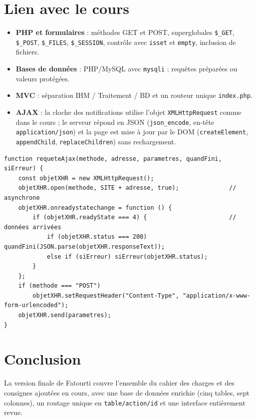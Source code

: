 \documentclass[11pt,a4paper]{article}
\begin{document}
\section{Lien avec le cours}
\begin{itemize}
\item \textbf{PHP et formulaires} : méthodes GET et POST, superglobales \texttt{\$\_GET}, \texttt{\$\_POST},
  \texttt{\$\_FILES}, \texttt{\$\_SESSION}, contrôle avec \texttt{isset} et \texttt{empty}, inclusion de fichiers.
\item \textbf{Bases de données} : PHP/MySQL avec \texttt{mysqli} ; requêtes préparées ou valeurs protégées.
\item \textbf{MVC} : séparation IHM / Traitement / BD et un routeur unique \texttt{index.php}.
\item \textbf{AJAX} : la cloche des notifications utilise l'objet \texttt{XMLHttpRequest} comme dans le cours ;
  le serveur répond en JSON (\texttt{json\_encode}, en-tête \texttt{application/json}) et la page est mise à jour
  par le DOM (\texttt{createElement}, \texttt{appendChild}, \texttt{replaceChildren}) sans rechargement.
\end{itemize}
\begin{lstlisting}
function requeteAjax(methode, adresse, parametres, quandFini, siErreur) {
    const objetXHR = new XMLHttpRequest();
    objetXHR.open(methode, SITE + adresse, true);              // asynchrone
    objetXHR.onreadystatechange = function () {
        if (objetXHR.readyState === 4) {                       // données arrivées
            if (objetXHR.status === 200) quandFini(JSON.parse(objetXHR.responseText));
            else if (siErreur) siErreur(objetXHR.status);
        }
    };
    if (methode === "POST")
        objetXHR.setRequestHeader("Content-Type", "application/x-www-form-urlencoded");
    objetXHR.send(parametres);
}
\end{lstlisting}

\section*{Conclusion}
La version finale de Fatourti couvre l'ensemble du cahier des charges et des consignes ajoutées en cours,
avec une base de données enrichie (cinq tables, sept colonnes), un routage unique en \texttt{table/action/id}
et une interface entièrement revue.
\end{document}
